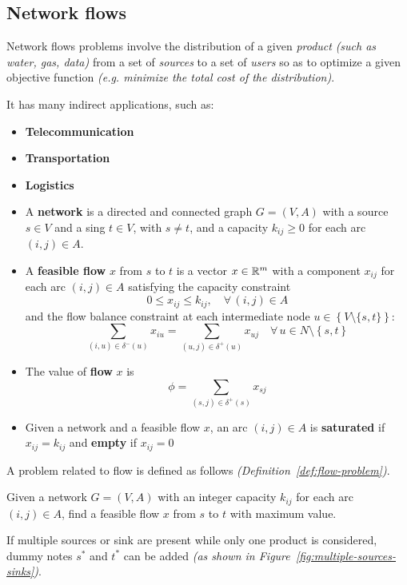 \documentclass[english]{article}
\begin{document}
\subsection{Network flows}

Network flows problems involve the distribution of a given \textit{product} \textit{(such as water, gas, data)} from a set of \textit{sources} to a set of \textit{users} so as to optimize a given objective function \textit{(e.g. minimize the total cost of the distribution)}.

It has many indirect applications, such as:

\begin{itemize}
  \item \textbf{Telecommunication}
  \item \textbf{Transportation}
  \item \textbf{Logistics}
\end{itemize}

\begin{itemize}
  \item A \textbf{network} is a directed and connected graph \(G = (V, A)\) with a source \(s \in V\) and a sing \(t \in V\), with \(s \neq t\), and a capacity \(k_{ij} \geq 0\) for each arc \((i, j) \in A\).
  \item A \textbf{feasible flow} \(x\) from \(s\) to \(t\) is a vector \(x \in \mathbb{R}^m\) with a component \(x_{ij}\) for each arc \((i, j) \in A\) satisfying the capacity constraint \[0 \leq x_{ij} \leq k_{ij}, \quad \forall \, \left( i, j \right) \in A\]
        and the flow balance constraint at each intermediate node \(u \in \left\{ V \setminus \{s, t\} \right\}\):
        \[\displaystyle \sum_{\left( i, u \right) \in \delta^{-}(u)} x_{iu} = \displaystyle \sum_{\left( u, j \right) \in \delta^{+}(u)} x_{uj} \quad \forall \, u \in N \setminus \left\{ s, t \right\} \]
  \item The value of \textbf{flow} \(x\) is
        \[\phi = \displaystyle \sum_{\left( s, j \right) \in \delta^{+}(s)} x_{sj}\]
  \item Given a network and a feasible flow \(x\), an arc \(\left( i, j \right) \in A\) is \textbf{saturated} if \(x_{ij} = k_{ij}\) and \textbf{empty} if \(x_{ij} = 0\)
\end{itemize}

\bigskip
A problem related to flow is defined as follows \textit{(Definition~\ref{def:flow-problem})}.

\begin{definition}
  Given a network \(G = \left( V, A \right)\) with an integer capacity \(k_{ij}\) for each arc \((i, j) \in A\), find a feasible flow \(x\) from \(s\) to \(t\) with maximum value.

  If multiple sources or sink are present while only one product is considered, dummy notes \(s^\ast\) and \(t^\ast\) can be added \textit{(as shown in Figure~\ref{fig:multiple-sources-sinks})}.
  \label{def:flow-problem}
\end{definition}
\end{document}
